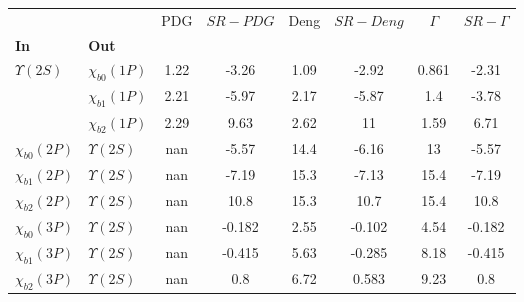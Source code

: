 \begin{tabular}{l|l|c|c|c|c|c|c}
\toprule
                &                &  PDG & $SR-PDG$ &  Deng & $SR-Deng$ &  $\Gamma$ & $SR-\Gamma$ \\
\textbf{In} & \textbf{Out} &      &          &       &           &           &             \\
\midrule
\textbf{$\Upsilon(2S)$} & \textbf{$\chi_{b0}(1P)$} & 1.22 &    -3.26 &  1.09 &     -2.92 &     0.861 &       -2.31 \\
                & \textbf{$\chi_{b1}(1P)$} & 2.21 &    -5.97 &  2.17 &     -5.87 &       1.4 &       -3.78 \\
                & \textbf{$\chi_{b2}(1P)$} & 2.29 &     9.63 &  2.62 &        11 &      1.59 &        6.71 \\
\textbf{$\chi_{b0}(2P)$} & \textbf{$\Upsilon(2S)$} &  nan &    -5.57 &  14.4 &     -6.16 &        13 &       -5.57 \\
\textbf{$\chi_{b1}(2P)$} & \textbf{$\Upsilon(2S)$} &  nan &    -7.19 &  15.3 &     -7.13 &      15.4 &       -7.19 \\
\textbf{$\chi_{b2}(2P)$} & \textbf{$\Upsilon(2S)$} &  nan &     10.8 &  15.3 &      10.7 &      15.4 &        10.8 \\
\textbf{$\chi_{b0}(3P)$} & \textbf{$\Upsilon(2S)$} &  nan &   -0.182 &  2.55 &    -0.102 &      4.54 &      -0.182 \\
\textbf{$\chi_{b1}(3P)$} & \textbf{$\Upsilon(2S)$} &  nan &   -0.415 &  5.63 &    -0.285 &      8.18 &      -0.415 \\
\textbf{$\chi_{b2}(3P)$} & \textbf{$\Upsilon(2S)$} &  nan &      0.8 &  6.72 &     0.583 &      9.23 &         0.8 \\
\bottomrule
\end{tabular}
